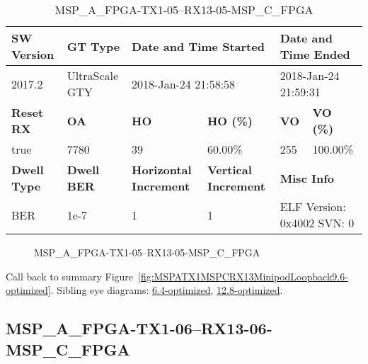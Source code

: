 \begin{table}[h]
\centering
\caption{MSP\_A\_FPGA-TX1-05--RX13-05-MSP\_C\_FPGA}
\label{tab:MSPAFPGATX105RX1305MSPCFPGA9.6-optimized}
\begin{tabular}{@{}|l|l|l|l|l|l|@{}}
\toprule
\textbf{SW Version}                & \textbf{GT Type}   & \multicolumn{2}{l|}{\textbf{Date and Time Started}}            & \multicolumn{2}{l|}{\textbf{Date and Time Ended}}        \\ \midrule
2017.2                       & UltraScale GTY          & \multicolumn{2}{l|}{2018-Jan-24 21:58:58}                   & \multicolumn{2}{l|}{2018-Jan-24 21:59:31}               \\ \midrule
\textbf{Reset RX}                  & \textbf{OA} & \textbf{HO}   & \textbf{HO (\%)} & \textbf{VO} & \textbf{VO (\%)} \\ \midrule
true & 7780        & 39          & 60.00\%        & 255        & 100.00\%       \\ \midrule
\textbf{Dwell Type}                & \textbf{Dwell BER} & \textbf{Horizontal Increment} & \textbf{Vertical Increment}    & \multicolumn{2}{l|}{\textbf{Misc Info}}                  \\ \midrule
BER                            & 1e-7        & 1        & 1           & \multicolumn{2}{l|}{ELF Version: 0x4002 SVN: 0}                         \\ \bottomrule
\end{tabular}
\end{table}

\begin{figure}[h]
\caption{MSP\_A\_FPGA-TX1-05--RX13-05-MSP\_C\_FPGA} \label{fig:MSPAFPGATX105RX1305MSPCFPGA9.6-optimized}
\end{figure}

Call back to summary Figure~\ref{fig:MSPATX1MSPCRX13MinipodLoopback9.6-optimized}.
Sibling eye diagrams: \hyperref[sec:MSPAFPGATX105RX1305MSPCFPGA6.4-optimized]{6.4-optimized}, \hyperref[sec:MSPAFPGATX105RX1305MSPCFPGA12.8-optimized]{12.8-optimized}.

\clearpage
\newpage


\subsection{MSP\_A\_FPGA-TX1-06--RX13-06-MSP\_C\_FPGA}\label{sec:MSPAFPGATX106RX1306MSPCFPGA9.6-optimized}


